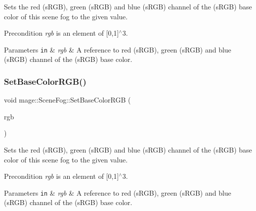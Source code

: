 Sets the red (s\+R\+GB), green (s\+R\+GB) and blue (s\+R\+GB) channel of the (s\+R\+GB) base color of this scene fog to the given value.

\begin{DoxyPrecond}{Precondition}
{\itshape rgb} is an element of \mbox{[}0,1\mbox{]}$^\wedge$3. 
\end{DoxyPrecond}

\begin{DoxyParams}[1]{Parameters}
\mbox{\tt in}  & {\em rgb} & A reference to red (s\+R\+GB), green (s\+R\+GB) and blue (s\+R\+GB) channel of the (s\+R\+GB) base color. \\
\hline
\end{DoxyParams}
\hypertarget{classmage_1_1_scene_fog_a4e5e9ea50ed5bb1077fe69c2e6efc9e7}{}\label{classmage_1_1_scene_fog_a4e5e9ea50ed5bb1077fe69c2e6efc9e7} 
\subsubsection{\texorpdfstring{Set\+Base\+Color\+R\+G\+B()}{SetBaseColorRGB()}\hspace{0.1cm}{\footnotesize\ttfamily [3/3]}}
{\footnotesize\ttfamily void mage\+::\+Scene\+Fog\+::\+Set\+Base\+Color\+R\+GB (\begin{DoxyParamCaption}\item[{\hyperlink{structmage_1_1_r_g_b_spectrum}{R\+G\+B\+Spectrum} \&\&}]{rgb }\end{DoxyParamCaption})\hspace{0.3cm}{\ttfamily [noexcept]}}

Sets the red (s\+R\+GB), green (s\+R\+GB) and blue (s\+R\+GB) channel of the (s\+R\+GB) base color of this scene fog to the given value.

\begin{DoxyPrecond}{Precondition}
{\itshape rgb} is an element of \mbox{[}0,1\mbox{]}$^\wedge$3. 
\end{DoxyPrecond}

\begin{DoxyParams}[1]{Parameters}
\mbox{\tt in}  & {\em rgb} & A reference to red (s\+R\+GB), green (s\+R\+GB) and blue (s\+R\+GB) channel of the (s\+R\+GB) base color. \\
\hline
\end{DoxyParams}
\hypertarget{classmage_1_1_scene_fog_a35df66af255b6d274d7048e17b15bcb6}{}\label{classmage_1_1_scene_fog_a35df66af255b6d274d7048e17b15bcb6} 
